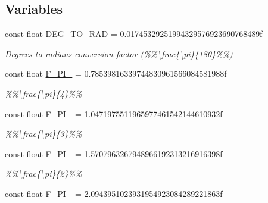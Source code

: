 \subsection*{Variables}
\begin{DoxyCompactItemize}
\item 
\hypertarget{group___scalar_math_consts_ga775ec2b017832b9f00808716a8a5678d}{}const float \hyperlink{group___scalar_math_consts_ga775ec2b017832b9f00808716a8a5678d}{D\+E\+G\+\_\+\+T\+O\+\_\+\+R\+A\+D} = 0.\+01745329251994329576923690768489f\label{group___scalar_math_consts_ga775ec2b017832b9f00808716a8a5678d}

\begin{DoxyCompactList}\small\item\em Degrees to radians conversion factor (\%\%\textbackslash{}frac\{\textbackslash{}pi\}\{180\}\%\%) \end{DoxyCompactList}\item 
\hypertarget{group___scalar_math_consts_ga25da08d770169dc837f7e766a4af50c7}{}const float \hyperlink{group___scalar_math_consts_ga25da08d770169dc837f7e766a4af50c7}{F\+\_\+\+P\+I\+\_} = 0.\+78539816339744830961566084581988f\label{group___scalar_math_consts_ga25da08d770169dc837f7e766a4af50c7}

\begin{DoxyCompactList}\small\item\em \%\%\textbackslash{}frac\{\textbackslash{}pi\}\{4\}\%\% \end{DoxyCompactList}\item 
\hypertarget{group___scalar_math_consts_ga55f78cc108bc6d4c3338b9a5605ea23e}{}const float \hyperlink{group___scalar_math_consts_ga55f78cc108bc6d4c3338b9a5605ea23e}{F\+\_\+\+P\+I\+\_} = 1.\+0471975511965977461542144610932f\label{group___scalar_math_consts_ga55f78cc108bc6d4c3338b9a5605ea23e}

\begin{DoxyCompactList}\small\item\em \%\%\textbackslash{}frac\{\textbackslash{}pi\}\{3\}\%\% \end{DoxyCompactList}\item 
\hypertarget{group___scalar_math_consts_ga0c8bf8cc8172c063476b12e41af90fdd}{}const float \hyperlink{group___scalar_math_consts_ga0c8bf8cc8172c063476b12e41af90fdd}{F\+\_\+\+P\+I\+\_} = 1.\+5707963267948966192313216916398f\label{group___scalar_math_consts_ga0c8bf8cc8172c063476b12e41af90fdd}

\begin{DoxyCompactList}\small\item\em \%\%\textbackslash{}frac\{\textbackslash{}pi\}\{2\}\%\% \end{DoxyCompactList}\item 
\hypertarget{group___scalar_math_consts_gaf3d6bddb166a005a45bc10c5a28439db}{}const float \hyperlink{group___scalar_math_consts_gaf3d6bddb166a005a45bc10c5a28439db}{F\+\_\+P\+I\+\_} = 2.\+0943951023931954923084289221863f\label{group___scalar_math_consts_gaf3d6bddb166a005a45bc10c5a28439db}


\end{DoxyCompactItemize}

